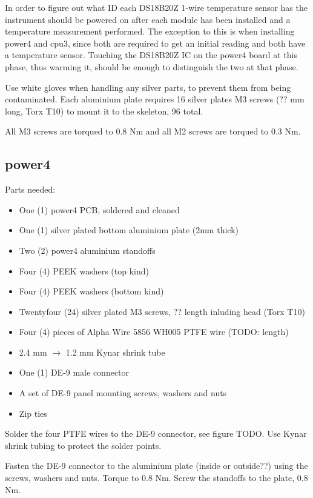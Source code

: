 \documentclass{article}
\begin{document}
In order to figure out what ID each DS18B20Z 1-wire temperature sensor has
the instrument should be powered on after each module has been installed and
a temperature measurement performed.
The exception to this is when installing power4 and cpu3,
since both are required to get an initial reading and both have a temperature sensor.
Touching the DS18B20Z IC on the power4 board at this phase, thus warming it,
should be enough to distinguish the two at that phase.

Use white gloves when handling any silver parts, to prevent them from being contaminated.
Each aluminium plate requires 16 silver plates M3 screws (?? mm long, Torx T10) to mount it to the skeleton, 96 total.

All M3 screws are torqued to 0.8 Nm and all M2 screws are torqued to 0.3 Nm.

\subsection{power4}

Parts needed:

\begin{itemize}
\item One (1) power4 PCB, soldered and cleaned
\item One (1) silver plated bottom aluminium plate (2mm thick)
\item Two (2) power4 aluminium standoffs
\item Four (4) PEEK washers (top kind)
\item Four (4) PEEK washers (bottom kind)
\item Twentyfour (24) silver plated M3 screws, ?? length inluding head (Torx T10)
\item Four (4) pieces of Alpha Wire 5856 WH005 PTFE wire (TODO: length)
\item 2.4 mm $\rightarrow$ 1.2 mm Kynar shrink tube
\item One (1) DE-9 male connector
\item A set of DE-9 panel mounting screws, washers and nuts
\item Zip ties
\end{itemize}

Solder the four PTFE wires to the DE-9 connector, see figure TODO.
Use Kynar shrink tubing to protect the solder points.

Fasten the DE-9 connector to the aluminium plate (inside or outside??) using the screws, washers and nuts.
Torque to 0.8 Nm.
Screw the standoffs to the plate, 0.8 Nm.
\end{document}
